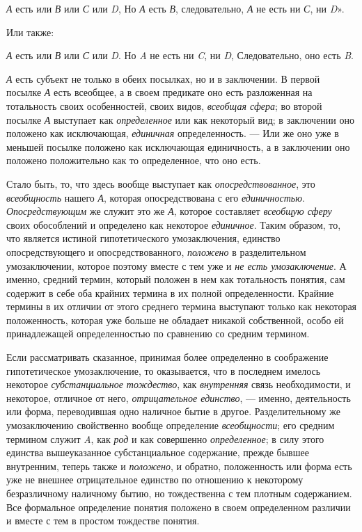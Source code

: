 \documentclass[twoside]{article}
\begin{document}
{{{{{{{\em А} есть или {\em В} или {\em С} или {\em D},
Но {\em А} есть {\em В}, следовательно, {\em А} не есть ни {\em С}, ни {\em D}».

Или также:

{\em А} есть или {\em В} или {\em С} или {\em D}.
Но {\em A} не есть ни {\em C}, ни {\em D},
Следовательно, оно есть {\em B}.

{\em А} есть субъект не
только в обеих посылках, но и в заключении. В первой посылке
{\em А} есть всеобщее, а
в своем предикате оно есть разложенная на тотальность своих особенностей,
своих видов, {\em всеобщая сфера};
во второй посылке {\em А}
выступает как
{\em определенное} или
как некоторый вид; в заключении оно положено как исключающая,
{\em единичная}
определенность. — Или же оно уже в меньшей
посылке положено как исключающая единичность, а в заключении оно положено
положительно как то определенное, что оно есть.

Стало быть, то, что здесь вообще выступает как
{\em опосредствованное},
это {\em всеобщность}
нашего {\em А},
которая опосредствована с его
{\em единичностью}.
{\em Опосредствующим} же
служит это же {\em А},
которое составляет
{\em всеобщую сферу}
своих обособлений и определено как некоторое
{\em единичное}. Таким
образом, то, что является истиной гипотетического умозаключения, единство
опосредствующего и опосредствованного,
{\em положено} в
разделительном умозаключении, которое поэтому вместе с тем уже и
{\em не есть умозаключение}.
А именно, средний термин, который положен в нем как
тотальность понятия, сам содержит в себе оба крайних термина в их полной
определенности. Крайние термины в их отличии от этого среднего термина
выступают только как некоторая положенность, которая уже больше не обладает
никакой собственной, особо ей принадлежащей определенностью по сравнению со
средним термином.

Если рассматривать сказанное, принимая более определенно в
соображение гипотетическое умозаключение, то оказывается, что в последнем
имелось некоторое {\em субстанциальное
тождество}, как
{\em внутренняя} связь
необходимости, и некоторое, отличное от него,
{\em отрицательное единство}, —
именно, деятельность или форма, переводившая одно наличное
бытие в другое. Разделительному же умозаключению свойственно вообще
определение {\em всеобщности};
его средним термином служит {\em A},
как {\em род}
и как совершенно
{\em определенное}; в
силу этого единства вышеуказанное субстанциальное содержание, прежде бывшее
внутренним, теперь также и
{\em положено}, и
обратно, положенность или форма есть уже не внешнее отрицательное единство
по отношению к некоторому безразличному наличному бытию, но тождественна с
тем плотным содержанием. Все формальное определение понятия положено в
своем определенном различии и вместе с тем в простом тождестве понятия.

}}}}}}
\end{document}
